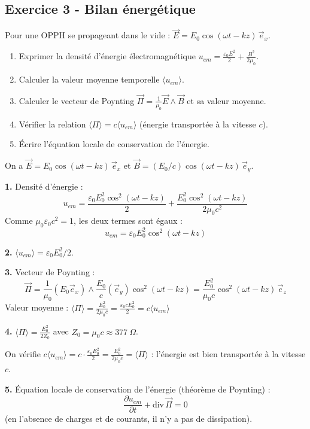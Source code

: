 \documentclass[12pt,a4paper]{article}
\begin{document}
\subsection*{Exercice 3 - Bilan énergétique \niveau{\moyen}}

\begin{boiteexercice}
Pour une OPPH se propageant dans le vide : $\vec{E} = E_0\cos(\omega t - kz)\,\vec{e}_x$.
\begin{enumerate}
  \item Exprimer la densité d'énergie électromagnétique $u_{em} = \frac{\varepsilon_0 E^2}{2} + \frac{B^2}{2\mu_0}$.
  \item Calculer la valeur moyenne temporelle $\langle u_{em}\rangle$.
  \item Calculer le vecteur de Poynting $\vec{\Pi} = \frac{1}{\mu_0}\vec{E}\wedge\vec{B}$ et sa valeur moyenne.
  \item Vérifier la relation $\langle\Pi\rangle = c\langle u_{em}\rangle$ (énergie transportée à la vitesse $c$).
  \item Écrire l'équation locale de conservation de l'énergie.
\end{enumerate}
\end{boiteexercice}

\begin{boitecorrige}
On a $\vec{E} = E_0\cos(\omega t-kz)\,\vec{e}_x$ et $\vec{B} = (E_0/c)\cos(\omega t-kz)\,\vec{e}_y$.

\textbf{1.} Densité d'énergie :
\[
u_{em} = \frac{\varepsilon_0 E_0^2\cos^2(\omega t-kz)}{2} + \frac{E_0^2\cos^2(\omega t-kz)}{2\mu_0 c^2}
\]
Comme $\mu_0\varepsilon_0 c^2 = 1$, les deux termes sont égaux :
\[
u_{em} = \varepsilon_0 E_0^2\cos^2(\omega t-kz)
\]

\textbf{2.} $\langle u_{em}\rangle = \varepsilon_0 E_0^2/2$.

\textbf{3.} Vecteur de Poynting :
\[
\vec{\Pi} = \frac{1}{\mu_0}(E_0\vec{e}_x)\wedge\frac{E_0}{c}(\vec{e}_y)\cos^2(\omega t-kz) = \frac{E_0^2}{\mu_0 c}\cos^2(\omega t-kz)\,\vec{e}_z
\]
Valeur moyenne : $\langle\Pi\rangle = \frac{E_0^2}{2\mu_0 c} = \frac{\varepsilon_0 cE_0^2}{2} = c\langle u_{em}\rangle$

\textbf{4.} $\langle\Pi\rangle = \frac{E_0^2}{2Z_0}$ avec $Z_0 = \mu_0 c \approx \qty{377}{\Omega}$.

On vérifie $c\langle u_{em}\rangle = c\cdot\frac{\varepsilon_0 E_0^2}{2} = \frac{E_0^2}{2\mu_0 c} = \langle\Pi\rangle$ : l'énergie est bien transportée à la vitesse $c$.

\textbf{5.} Équation locale de conservation de l'énergie (théorème de Poynting) :
\[
\frac{\partial u_{em}}{\partial t} + \mathrm{div}\,\vec{\Pi} = 0
\]
(en l'absence de charges et de courants, il n'y a pas de dissipation).
\end{boitecorrige}
\end{document}
